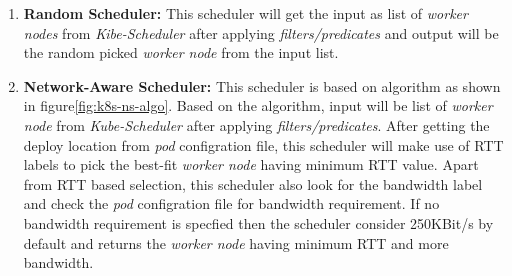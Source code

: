 \begin{enumerate}
  \item \textbf{Random Scheduler:} This scheduler will get the  input as list of \emph{worker nodes} from \emph{Kibe-Scheduler} after applying \emph{filters/predicates} and output will be the random picked \emph{worker node} from the input list.
  \item \textbf{Network-Aware Scheduler:} This scheduler is based on algorithm as shown in figure\ref{fig:k8s-ns-algo}. Based on the algorithm, input will be list of \emph{worker node} from \emph{Kube-Scheduler} after applying \emph{filters/predicates}. After getting the deploy location from \emph{pod} configration file, this scheduler will make use of RTT labels to pick the best-fit \emph{worker node} having minimum RTT value\cite{Santos2019}. Apart from RTT based selection, this scheduler also look for the bandwidth label and check the \emph{pod} configration file for bandwidth requirement. If no bandwidth requirement is specfied then the scheduler consider 250KBit/s by default and returns the \emph{worker node} having minimum RTT and more bandwidth\cite{Santos2019}.
\end{enumerate}
